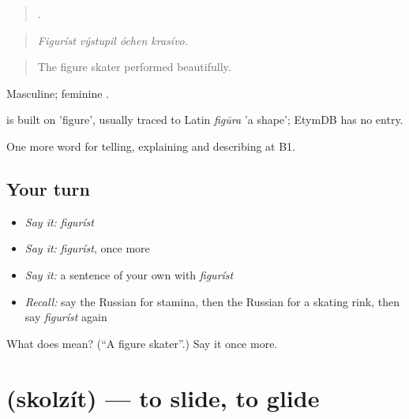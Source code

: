\begin{quote}
   .
\end{quote}

\begin{quote}
\emph{Figuríst výstupil óchen krasívo.}
\end{quote}

\begin{quote}
The figure skater performed beautifully.
\end{quote}

Masculine; feminine .

\begin{cousinweb}
\emph{} is built on \emph{} 'figure', usually traced to Latin \emph{figūra} 'a shape'; EtymDB has no entry.
\end{cousinweb}

\begin{grammarlens}[title={What you've built}]
One more word for telling, explaining and describing at B1.
\end{grammarlens}

\subsection*{Your turn}
\begin{itemize}
\raggedright
  \item \emph{Say it:} \emph{figuríst}
  \item \emph{Say it:} \emph{figuríst}, once more
  \item \emph{Say it:} a sentence of your own with \emph{figuríst}
  \item \emph{Recall:} say the Russian for stamina, then the Russian for a skating rink, then say \emph{figuríst} again
\end{itemize}

\begin{tcolorbox}[breakable,colback=teal!4,colframe=teal!35!black,title={Before you move on}]
What does  mean? (\textquotedblleft{}A figure skater\textquotedblright{}.) Say it once more.
\end{tcolorbox}
\section[\texorpdfstring{\ru{скользить} (skolzít)}{скользить (skolzít)}]{ (skolzít) — to slide, to glide}

\label{lesson:RU-C514-skolzit}



